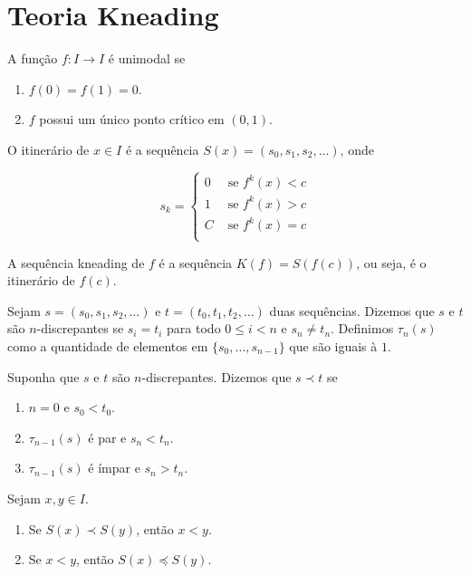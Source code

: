 \section{Teoria Kneading}

\begin{definition}
A função $f: I \to I$ é unimodal se
\begin{enumerate}
\item $f(0) = f(1) = 0$.
\item $f$ possui um único ponto crítico em $(0, 1)$.
\end{enumerate}
\end{definition}

\begin{definition}
O itinerário de $x \in I$ é  a sequência $S(x) = (s_0, s_1, s_2, \dots)$, onde

\[ s_k = 
\begin{cases} 
  0 & \textrm{ se } f^k(x) < c \\
  1 & \textrm{ se } f^k(x) > c \\
  C & \textrm{ se } f^k(x) = c \\
\end{cases}
\]
\end{definition}

\begin{definition}
A sequência kneading de $f$ é a sequência $K(f) = S(f(c))$, ou seja, é o itinerário de $f(c)$.
\end{definition}

Sejam $s = (s_0, s_1, s_2, \dots)$ e $t = (t_0, t_1, t_2, \dots)$ duas sequências. Dizemos que $s$ e $t$ são $n$-discrepantes se $s_i = t_i$ para todo $0 \leq i < n$ e $s_n \neq t_n$. Definimos $\tau_n(s)$ como a quantidade de elementos em $\{ s_0, \dots, s_{n-1} \}$ que são iguais à $1$.

\begin{definition}
Suponha que $s$ e $t$ são $n$-discrepantes. Dizemos que $s \prec t$ se
\begin{enumerate}
\item $n = 0$ e $s_0 < t_0$.
\item $\tau_{n-1}(s)$ é par e $s_n < t_n$.
\item $\tau_{n-1}(s)$ é ímpar e $s_n > t_n$.
\end{enumerate}
\end{definition}

\begin{theorem}
Sejam $x, y \in I$.
\begin{enumerate}
\item Se $S(x) \prec S(y)$, então $x < y$.
\item Se $x < y$, então $S(x) \preceq S(y)$.
\end{enumerate}
\end{theorem}

